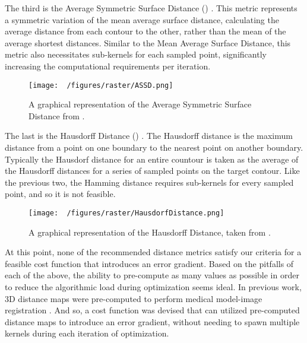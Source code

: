 The third is the Average Symmetric Surface Distance () \cite{yeghiazaryanFamilyBoundaryOverlap2018}.
This metric represents a symmetric variation of the mean average surface distance, calculating the average distance from each contour to the other, rather than the mean of the average shortest distances.
Similar to the Mean Average Surface Distance, this metric also necessitates sub-kernels for each sampled point, significantly increasing the computational requirements per iteration.

\begin{figure}[h!]
  \centering
  \texttt{[image: ~/figures/raster/ASSD.png]}
  \caption{A graphical representation of the Average Symmetric Surface Distance from \cite{reinkeUnderstandingMetricrelatedPitfalls2023,reinkeCommonLimitationsImage2023}.}
  \label{fig:ASSD}
\end{figure}

The last is the Hausdorff Distance () \cite{huttenlocherMultiresolutionTechniqueComparing1993,felzenszwalbDistanceTransformsSampled2012,huttenlocherComparingImagesUsing1993}.
The Hausdorff distance is the maximum distance from a point on one boundary to the nearest point on another boundary. Typically the Hausdorf distance for an entire countour is taken as the average of the Hausdorff distances for a series of sampled points on the target contour.
Like the previous two, the Hamming distance requires sub-kernels for every sampled point, and so it is not feasible.


\begin{figure}[h!]
  \centering
  \texttt{[image: ~/figures/raster/HausdorfDistance.png]}
  \caption{A graphical representation of the Hausdorff Distance, taken from \cite{reinkeCommonLimitationsImage2023,reinkeUnderstandingMetricrelatedPitfalls2023}.}
  \label{fig:HD}
\end{figure}

At this point, none of the recommended distance metrics satisfy our criteria for a feasible cost function that introduces an error gradient.
Based on the pitfalls of each of the above, the ability to pre-compute as many values as possible in order to reduce the algorithmic load during optimization seems ideal.
In previous work, 3D distance maps were pre-computed to perform medical model-image registration \cite{lavalleeRecoveringPositionOrientation1995,zuffiModelbasedMethodReconstruction1999}.
And so, a cost function was devised that can utilized pre-computed distance maps to introduce an error gradient, without needing to spawn multiple kernels during each iteration of optimization.

